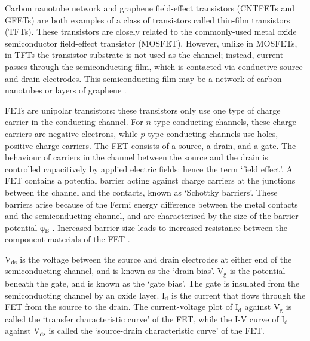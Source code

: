 \documentclass[
  a4paper,
]{scrbook}
\begin{document}
Carbon nanotube network and graphene field-effect transistors (CNTFETs
and GFETs) are both examples of a class of transistors called thin-film
transistors (TFTs). These transistors are closely related to the
commonly-used metal oxide semiconductor field-effect transistor
(MOSFET). However, unlike in MOSFETs, in TFTs the transistor substrate
is not used as the channel; instead, current passes through the
semiconducting film, which is contacted via conductive source and drain
electrodes. This semiconducting film may be a network of carbon
nanotubes or layers of graphene \autocite{Sun2013}.

FETs are unipolar transistors: these transistors only use one type of
charge carrier in the conducting channel. For \(n\)-type conducting
channels, these charge carriers are negative electrons, while \(p\)-type
conducting channels use holes, positive charge carriers. The FET
consists of a source, a drain, and a gate. The behaviour of carriers in
the channel between the source and the drain is controlled capacitively
by applied electric fields: hence the term `field effect'. A FET
contains a potential barrier acting against charge carriers at the
junctions between the channel and the contacts, known as `Schottky
barriers'. These barriers arise because of the Fermi energy difference
between the metal contacts and the semiconducting channel, and are
characterised by the size of the barrier potential φ\(_\textrm{B}\)
\autocite{Iijima1991}. Increased barrier size leads to increased
resistance between the component materials of the FET
\autocite{Zheng2016}.

V\(_\textrm{ds}\) is the voltage between the source and drain electrodes
at either end of the semiconducting channel, and is known as the `drain
bias'. V\(_\textrm{g}\) is the potential beneath the gate, and is known
as the `gate bias'. The gate is insulated from the semiconducting
channel by an oxide layer. I\(_\textrm{d}\) is the current that flows
through the FET from the source to the drain. The current-voltage plot
of I\(_\textrm{d}\) against V\(_\textrm{g}\) is called the `transfer
characteristic curve' of the FET, while the I-V curve of
I\(_\textrm{d}\) against V\(_\textrm{ds}\) is called the `source-drain
characteristic curve' of the FET.
\end{document}

